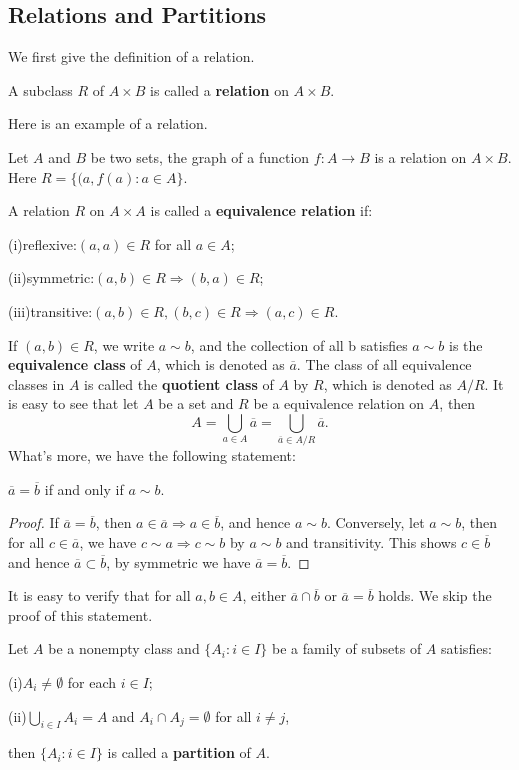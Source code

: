 \subsection{Relations and Partitions}
We first give the definition of a relation.
\begin{definition}
A subclass $R$ of $A\times B$ is called a \textbf{relation} on $A\times B$.
\end{definition}
Here is an example of a relation.
\begin{example}
Let $A$ and $B$ be two sets, the graph of a function $f:A\to B$ is a relation on $A\times B$. Here $R=\{(a,f(a):a\in A\}$.
\end{example}
\begin{definition}
A relation $R$ on $A\times A$ is called a \textbf{equivalence relation} if:\par
(i)reflexive:$(a,a)\in R$ for all $a\in A$;\par
(ii)symmetric:$(a,b)\in R\Rightarrow (b,a)\in R$;\par
(iii)transitive:$(a,b)\in R,(b,c)\in R\Rightarrow(a,c)\in R$.
\end{definition}
If $(a,b)\in R$, we write $a\sim b$, and the collection of all b satisfies $a\sim b$ is the \textbf{equivalence class} of $A$, which is denoted as $\overline{a}$. The class of all equivalence classes in $A$ is called the \textbf{quotient class} of $A$ by $R$, which is denoted as $A/R$. It is easy to see that let $A$ be a set and $R$ be a equivalence relation on $A$, then
$$A=\bigcup_{a\in A}\overline{a}=\bigcup_{\overline{a}\in A/R}\overline{a}.$$
What's more, we have the following statement:
\begin{proposition}
$\overline{a}=\overline{b}$ if and only if $a\sim b$.    
\end{proposition}
\begin{proof}
If $\overline{a}=\overline{b}$, then $a\in\overline{a}\Rightarrow a\in\overline{b}$, and hence $a\sim b$. Conversely, let $a\sim b$, then for all $c\in\overline{a}$, we have $c\sim a\Rightarrow c\sim b$ by $a\sim b$ and transitivity. This shows $c\in\overline{b}$ and hence $\overline{a}\subset\overline{b}$, by symmetric we have $\overline{a}=\overline{b}$.
\end{proof}
It is easy to verify that for all $a,b\in A$, either $\overline{a}\cap\overline{b}$ or $\overline{a}=\overline{b}$ holds. We skip the proof of this statement.
\begin{definition}
Let $A$ be a nonempty class and $\{A_i:i\in I\}$ be a family of subsets of $A$ satisfies:\par
(i)$A_i\ne\emptyset$ for each $i\in I$;\par
(ii)$\bigcup_{i\in I}A_i=A$ and $A_i\cap A_j=\emptyset$ for all $i\ne j$,\par
then $\{A_i:i\in I\}$ is called a \textbf{partition} of $A$.
\end{definition}
